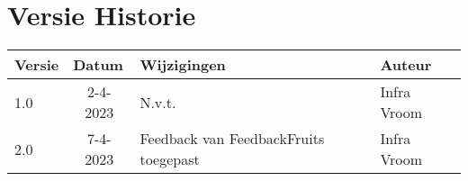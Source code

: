 \section*{Versie Historie} 

\begin{table}[h]
\begin{tabular}{|l|l|l|l|}
\hline
\rowcolor[HTML]{4472C4} 
{\color[HTML]{FFFFFF} \textbf{Versie}} &
  {\color[HTML]{FFFFFF} \textbf{Datum}} &
  {\color[HTML]{FFFFFF} \textbf{Wijzigingen}} &
  {\color[HTML]{FFFFFF} \textbf{Auteur}} \\ \hline
\rowcolor[HTML]{D9E1F2} 
1.0 &
  \multicolumn{1}{c|}{\cellcolor[HTML]{D9E1F2}2-4-2023} &
 N.v.t. &
  Infra   Vroom \\ \hline

\rowcolor[HTML]{FFFFFF} 
2.0 &
  \multicolumn{1}{c|}{\cellcolor[HTML]{FFFFFF}7-4-2023} &
 Feedback van FeedbackFruits toegepast &
  Infra   Vroom \\ \hline

  
\end{tabular}
\end{table}